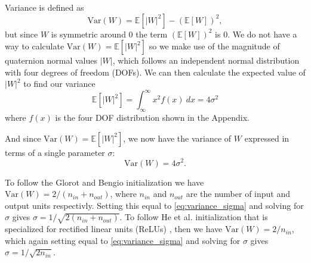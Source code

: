 \documentclass[14pt,a4paper]{article}
\begin{document}
Variance is defined as
\begin{equation}
\mbox{Var}(W) = \mathbb{E}[|W|^2] - (\mathbb{E}[W])^2,
\label{eq:variance}
\end{equation}
but since $W$ is symmetric around 0 the term $(\mathbb{E}[W])^2$ is 0. 
We do not have a way to calculate $\mbox{Var}(W) = \mathbb{E}[|W|^2]$ so we make use of the magnitude of quaternion normal values $|W|$, which follows an independent normal distribution with four degrees of freedom (DOFs).
We can then calculate the expected value of $|W|^2$ to find our variance
\begin{equation}
\mathbb{E}[|W|^2] = \int_\infty^\infty x^2 f(x) ~dx = 4\sigma^2
\label{eq:expected}
\end{equation}
where $f(x)$ is the four DOF distribution shown in the Appendix.

And since $\mbox{Var}(W) = \mathbb{E}[|W|^2]$, we now have the variance of $W$ expressed in terms of a single parameter $\sigma$:
\begin{equation}
\mbox{Var}(W) = 4\sigma^2.
\label{eq:variance_sigma}
\end{equation}



To follow the Glorot and Bengio \cite{glorot2010understanding} initialization we have $\mbox{Var}(W) = 2/(n_{in}+n_{out})$, where $n_{in}$ and $n_{out}$ are the number of input and output units respectivly. 
Setting this equal to \eqref{eq:variance_sigma} and solving for $\sigma$ gives $\sigma = 1/\sqrt{2(n_{in}+n_{out})}$.
To follow He et al. \cite{he2015delving} initialization that is specialized for rectified linear units (ReLUs) \cite{nair2010rectified}, then we have $\mbox{Var}(W) = 2/n_{in}$, which again setting equal to \eqref{eq:variance_sigma} and solving for $\sigma$ gives $\sigma = 1/\sqrt{2n_{in}}$.
\end{document}
